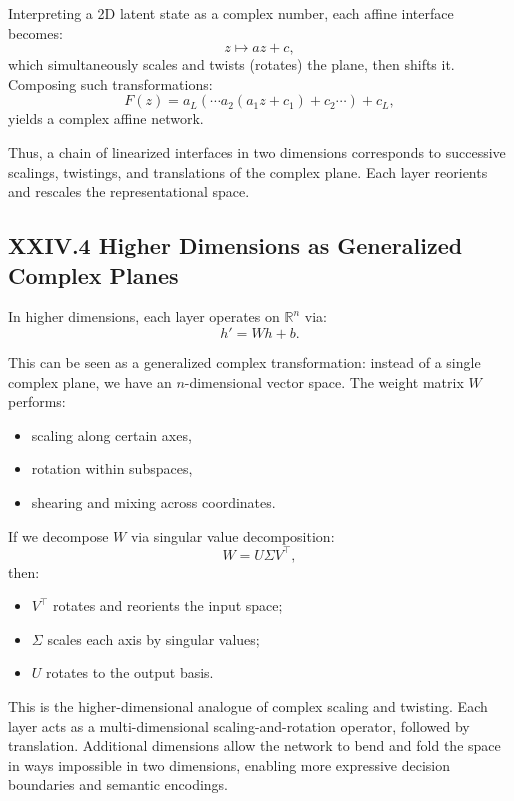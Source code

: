 \documentclass[12pt,letterpaper]{article}
\begin{document}
Interpreting a 2D latent state as a complex number, each affine interface becomes:
\[
z \mapsto a z + c,
\]
which simultaneously scales and twists (rotates) the plane, then shifts it. Composing such transformations:
\[
F(z) = a_L ( \cdots a_2 (a_1 z + c_1) + c_2 \cdots ) + c_L,
\]
yields a complex affine network.

Thus, a chain of linearized interfaces in two dimensions corresponds to successive scalings, twistings, and translations of the complex plane. Each layer reorients and rescales the representational space.

\subsection{XXIV.4 Higher Dimensions as Generalized Complex Planes}

In higher dimensions, each layer operates on $\mathbb{R}^n$ via:
\[
h' = W h + b.
\]

This can be seen as a generalized complex transformation: instead of a single complex plane, we have an $n$-dimensional vector space. The weight matrix $W$ performs:

\begin{itemize}
    \item scaling along certain axes,
    \item rotation within subspaces,
    \item shearing and mixing across coordinates.
\end{itemize}

If we decompose $W$ via singular value decomposition:
\[
W = U \Sigma V^\top,
\]
then:

\begin{itemize}
    \item $V^\top$ rotates and reorients the input space;
    \item $\Sigma$ scales each axis by singular values;
    \item $U$ rotates to the output basis.
\end{itemize}

This is the higher-dimensional analogue of complex scaling and twisting. Each layer acts as a multi-dimensional scaling-and-rotation operator, followed by translation. Additional dimensions allow the network to bend and fold the space in ways impossible in two dimensions, enabling more expressive decision boundaries and semantic encodings.
\end{document}
